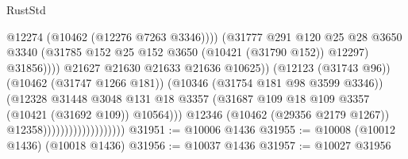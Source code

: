 \begin{lexlean}{RustStd}
\begin{coremodule}
                                                          @12274
                                                          (@10462 (@12276 @7263 @3346))))
                                                      (@31777
                                                        @291
                                                        @120
                                                        @25
                                                        @28
                                                        @3650
                                                        @3340
                                                        (@31785
                                                          @152
                                                          @25
                                                          @152
                                                          @3650
                                                          (@10421 (@31790 @152))
                                                          @12297)
                                                        @31856))))
                                                @21627
                                                @21630
                                                @21633
                                                @21636
                                                @10625))
                                            (@12123 (@31743 @96))
                                            (@10462 (@31747 @1266 @181))
                                            (@10346 (@31754 @181 @98 @3599 @3346))
                                            (@12328
                                              @31448
                                              @3048
                                              @131
                                              @18
                                              @3357
                                              (@31687
                                                @109
                                                @18
                                                @109
                                                @3357
                                                (@10421 (@31692 @109))
                                                @10564)))
                                          @12346
                                          (@10462 (@29356 @2179 @1267))
                                          @12358)))))))))))))))))))
@31951 := @10006 @1436
@31955 := @10008 (@10012 @1436) (@10018 @1436)
@31956 := @10037 @1436
@31957 := @10027 @31956

\end{coremodule}
\end{lexlean}
